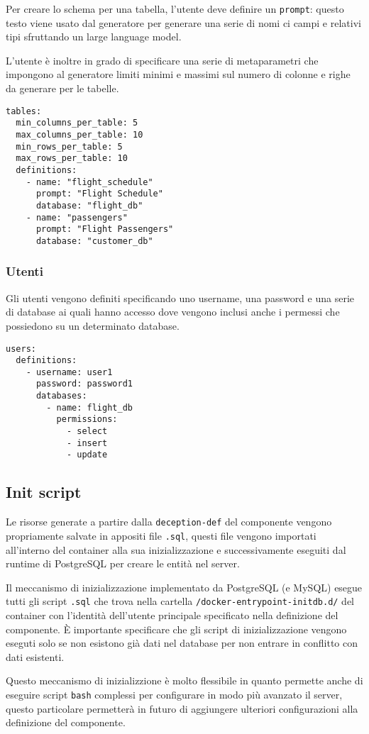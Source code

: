 Per creare lo schema per una tabella, l'utente deve definire un \texttt{prompt}: questo testo viene usato dal generatore per generare una serie di nomi ci campi e relativi tipi sfruttando un large language model.

L'utente è inoltre in grado di specificare una serie di metaparametri che impongono al generatore limiti minimi e massimi sul numero di colonne e righe da generare per le tabelle.

\begin{verbatim}
tables:
  min_columns_per_table: 5
  max_columns_per_table: 10
  min_rows_per_table: 5
  max_rows_per_table: 10
  definitions:
    - name: "flight_schedule"
      prompt: "Flight Schedule"
      database: "flight_db"
    - name: "passengers"
      prompt: "Flight Passengers"
      database: "customer_db"
\end{verbatim}

\subsubsection{Utenti}
Gli utenti vengono definiti specificando uno username, una password e una serie di database ai quali hanno accesso dove vengono inclusi anche i permessi che possiedono su un determinato database.

\begin{verbatim}
users:
  definitions:
    - username: user1
      password: password1
      databases:
        - name: flight_db
          permissions:
            - select
            - insert
            - update
\end{verbatim}

\subsection{Init script}
Le risorse generate a partire dalla \texttt{deception-def} del componente vengono propriamente salvate in appositi file \texttt{.sql}, questi file vengono importati all'interno del container alla sua inizializzazione e successivamente eseguiti dal runtime di PostgreSQL per creare le entità nel server.

Il meccanismo di inizializzazione implementato da PostgreSQL (e MySQL) esegue tutti gli script \texttt{.sql} che trova nella cartella \texttt{/docker-entrypoint-initdb.d/} del container con l'identità dell'utente principale specificato nella definizione del componente. \`E importante specificare che gli script di inizializzazione vengono eseguti solo se non esistono già dati nel database per non entrare in conflitto con dati esistenti.

Questo meccanismo di inizializzione è molto flessibile in quanto permette anche di eseguire script \texttt{bash} complessi per configurare in modo più avanzato il server, questo particolare permetterà in futuro di aggiungere ulteriori configurazioni alla definizione del componente.







